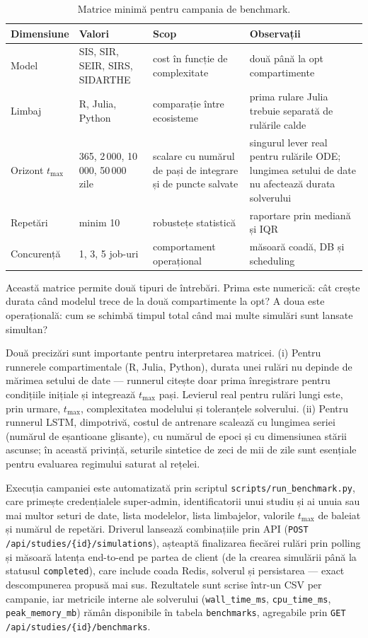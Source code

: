 \begin{table}[!htbp]
\centering
\caption[Matricea experimentală de benchmark]{Matrice minimă pentru campania de benchmark.}
\label{tab:matrice_benchmark}
\begin{tabularx}{0.95\textwidth}{l l X X}
\toprule
\textbf{Dimensiune} & \textbf{Valori} & \textbf{Scop} & \textbf{Observații} \\
\midrule
Model & SIS, SIR, SEIR, SIRS, SIDARTHE & cost în funcție de complexitate & două până la opt compartimente \\
Limbaj & R, Julia, Python & comparație între ecosisteme & prima rulare Julia trebuie separată de rulările calde \\
Orizont $t_{\max}$ & 365, 2\,000, 10\,000, 50\,000 zile & scalare cu numărul de pași de integrare și de puncte salvate & singurul lever real pentru rulările ODE; lungimea setului de date nu afectează durata solverului \\
Repetări & minim 10 & robustețe statistică & raportare prin mediană și IQR \\
Concurență & 1, 3, 5 job-uri & comportament operațional & măsoară coadă, DB și scheduling \\
\bottomrule
\end{tabularx}
\end{table}

Această matrice permite două tipuri de întrebări. Prima este numerică: cât crește
durata când modelul trece de la două compartimente la opt? A doua este
operațională: cum se schimbă timpul total când mai multe simulări sunt lansate
simultan?

Două precizări sunt importante pentru interpretarea matricei. (i) Pentru
runnerele compartimentale (R, Julia, Python), durata unei rulări nu depinde de
mărimea setului de date --- runnerul citește doar prima înregistrare pentru
condițiile inițiale și integrează $t_{\max}$ pași. Levierul real pentru rulări
lungi este, prin urmare, $t_{\max}$, complexitatea modelului și toleranțele
solverului. (ii) Pentru runnerul LSTM, dimpotrivă, costul de antrenare scalează
cu lungimea seriei (numărul de eșantioane glisante), cu numărul de epoci și cu
dimensiunea stării ascunse; în această privință, seturile sintetice de zeci de
mii de zile sunt esențiale pentru evaluarea regimului saturat al rețelei.

Execuția campaniei este automatizată prin scriptul
\texttt{scripts/run\_benchmark.py}, care primește credențialele super-admin,
identificatorii unui studiu și ai unuia sau mai multor seturi de date, lista
modelelor, lista limbajelor, valorile $t_{\max}$ de baleiat și numărul de
repetări. Driverul lansează combinațiile prin API
(\texttt{POST /api/studies/\{id\}/simulations}), așteaptă finalizarea fiecărei
rulări prin polling și măsoară latența end-to-end pe partea de client (de la
crearea simulării până la statusul \texttt{completed}), care include coada
Redis, solverul și persistarea --- exact descompunerea propusă mai sus.
Rezultatele sunt scrise într-un CSV per campanie, iar metricile interne ale
solverului (\texttt{wall\_time\_ms}, \texttt{cpu\_time\_ms},
\texttt{peak\_memory\_mb}) rămân disponibile în tabela \texttt{benchmarks},
agregabile prin \texttt{GET /api/studies/\{id\}/benchmarks}.


